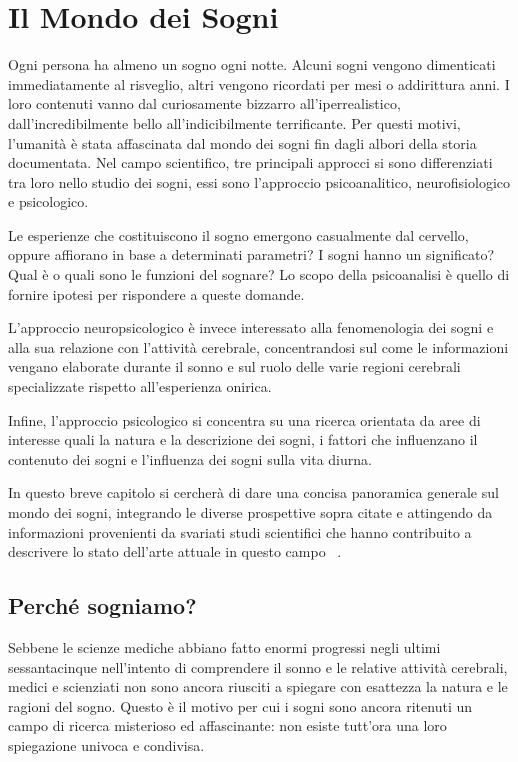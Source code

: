 \chapter{Il Mondo dei Sogni} \label{cap:mondo-dei-sogni}

Ogni persona ha almeno un sogno ogni notte.
Alcuni sogni vengono dimenticati immediatamente al risveglio, altri vengono ricordati per mesi o addirittura anni.
I loro contenuti vanno dal curiosamente bizzarro all'iperrealistico, dall'incredibilmente bello all'indicibilmente
terrificante.
Per questi motivi, l'umanità è stata affascinata dal mondo dei sogni fin dagli albori della storia documentata.
Nel campo scientifico, tre principali approcci si sono differenziati tra loro nello studio dei sogni, essi sono
l'approccio psicoanalitico, neurofisiologico e psicologico.

Le esperienze che costituiscono il sogno emergono casualmente dal cervello, oppure affiorano in base a determinati
parametri?
I sogni hanno un significato?
Qual è o quali sono le funzioni del sognare?
Lo scopo della psicoanalisi è quello di fornire ipotesi per rispondere a queste domande.

L'approccio neuropsicologico è invece interessato alla fenomenologia dei sogni e alla sua relazione con l'attività
cerebrale, concentrandosi sul come le informazioni vengano elaborate durante il sonno e sul ruolo delle varie regioni
cerebrali specializzate rispetto all'esperienza onirica.

Infine, l'approccio psicologico si concentra su una ricerca orientata da aree di interesse quali
la natura e la descrizione dei sogni, i fattori che influenzano il contenuto dei sogni e l'influenza dei sogni sulla
vita diurna.

In questo breve capitolo si cercherà di dare una concisa panoramica generale sul mondo dei sogni, integrando le diverse
prospettive sopra citate e attingendo da informazioni provenienti da svariati studi scientifici che hanno contribuito
a descrivere lo stato dell'arte attuale in questo campo ~\cite{Ruby2011ExperimentalRO, Akhtar2022, Schredl2005}.


\section{Perché sogniamo?}
Sebbene le scienze mediche abbiano fatto enormi progressi negli ultimi sessantacinque nell'intento di comprendere il
sonno e le relative attività cerebrali, medici e scienziati non sono ancora riusciti a spiegare con esattezza la
natura e le ragioni del sogno.
Questo è il motivo per cui i sogni sono ancora ritenuti un campo di ricerca misterioso ed affascinante: non esiste
tutt'ora una loro spiegazione univoca e condivisa.

